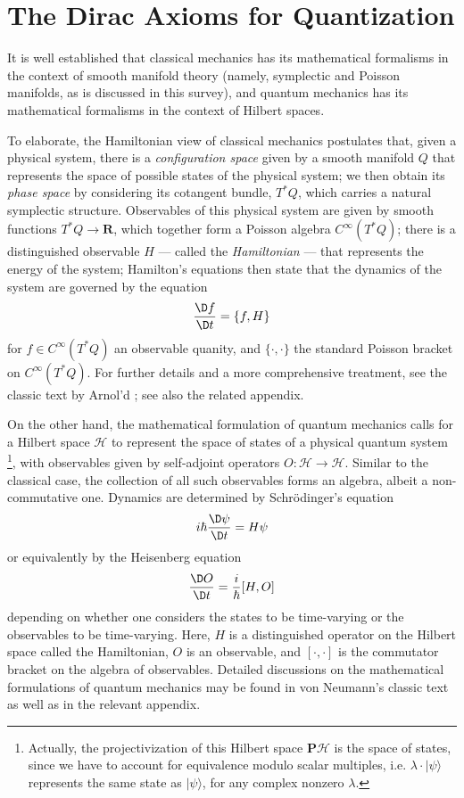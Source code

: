 \section{The Dirac Axioms for Quantization}
It is well established that classical mechanics has its mathematical formalisms in the context of smooth manifold theory (namely, symplectic and Poisson manifolds, as is discussed in this survey), and quantum mechanics has its mathematical formalisms in the context of Hilbert spaces.

To elaborate, the Hamiltonian view of classical mechanics postulates that, given a physical system, there is a \emph{configuration space} given by a smooth manifold $Q$ that represents the space of possible states of the physical system; we then obtain its \emph{phase space} by considering its cotangent bundle, $T^*Q$, which carries a natural symplectic structure. Observables of this physical system are given by smooth functions $T^*Q \to \mathbf{R}$, which together form a Poisson algebra $C^\infty(T^*Q)$; there is a distinguished observable $H$ --- called the \emph{Hamiltonian} --- that represents the energy of the system; Hamilton's equations then state that the dynamics of the system are governed by the equation
$$
\frac{\D f}{\D t} = \{f,H\}
$$
for $f \in C^\infty(T^*Q)$ an observable quanity, and $\{\cdot,\cdot\}$ the standard Poisson bracket on $C^\infty(T^*Q)$.
For further details and a more comprehensive treatment, see the classic text by Arnol'd \cite{arnold}; see also the related appendix.

On the other hand, the mathematical formulation of quantum mechanics calls for a Hilbert space $\mathcal{H}$ to represent the space of states of a physical quantum system \footnote{Actually, the projectivization of this Hilbert space $\mathbf{P}\mathcal{H}$ is the space of states, since we have to account for equivalence modulo scalar multiples, i.e. $\lambda \cdot |\psi\rangle$ represents the same state as $|\psi\rangle$, for any complex nonzero $\lambda$.}, with observables given by self-adjoint operators $O: \mathcal{H} \to \mathcal{H}$. Similar to the classical case, the collection of all such observables forms an algebra, albeit a non-commutative one. Dynamics are determined by Schr\"{o}dinger's equation
$$
i\hbar \frac{\D\psi}{\D t} = H\psi
$$
or equivalently by the Heisenberg equation
$$
\frac{\D O}{\D t} = \frac{i}{\hbar}[H,O]
$$
depending on whether one considers the states to be time-varying or the observables to be time-varying. Here, $H$ is a distinguished operator on the Hilbert space called the Hamiltonian, $O$ is an observable, and $[\cdot,\cdot]$ is the commutator bracket on the algebra of observables.
Detailed discussions on the mathematical formulations of quantum mechanics may be found in von Neumann's classic text \cite{vonNeumann} as well as in the relevant appendix.

